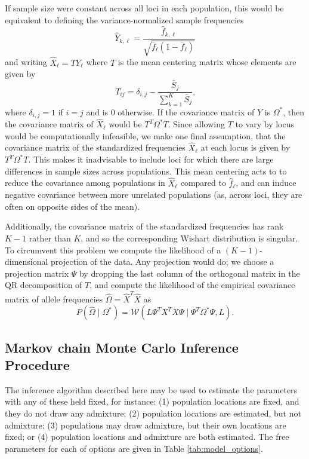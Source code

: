 \documentclass[10pt,letterpaper]{article}
\newcommand{\given}{\mid}
\begin{document}
If sample size were constant across all loci in each population, this would be equivalent to defining the variance-normalized sample frequencies
\begin{equation}
\hat{Y}_{k,\ell} = \frac{ \hat{f}_{k,\ell} } {\sqrt{\bar{f}_{\ell}(1-\bar{f}_{\ell})}}
\end{equation}
and writing $\hat{X}_{\ell} = T Y_{\ell} $ where $T$ is the mean centering matrix whose elements are given by
\begin{equation}
T_{ij} = \delta_{i,j}  -  \frac{\bar{S}_j}{\sum\limits_{k=1}^{K} \bar{S}_j	} \text{,}
\end{equation}
where $\delta_{i,j}=1$ if $i=j$ and is 0 otherwise.
If the covariance matrix of $Y$ is $\Omega^*$,
then the covariance matrix of $\hat X_\ell$ would be $T^T \Omega^* T$.
Since allowing $T$ to vary by locus would be computationally infeasible,
we make one final assumption,
that the covariance matrix of the standardized frequencies $\hat X_\ell$ at each locus is given by $T^T \Omega^* T$.
This makes it inadvisable to include loci for which there are large differences in sample sizes across populations.
This mean centering acts to to reduce the covariance among populations in $\hat{X}_{\ell}$ compared to $\hat{f}_{\ell}$, and can induce negative covariance between more unrelated populations (as, across loci, they are often on opposite sides of the mean). 

Additionally, the covariance matrix of the standardized frequencies has rank $K-1$ rather than $K$,
and so the corresponding Wishart distribution is singular.
To circumvent this problem we compute the likelihood of a $(K-1)$-dimensional projection of the data.
Any projection would do; we choose a projection matrix $\Psi$ by dropping the last column of the orthogonal matrix in the QR decomposition of $T$,
and compute the likelihood of the empirical covariance matrix of allele frequencies $\widehat\Omega = \hat X^T \hat X$ as
\begin{equation} \label{eq:projected_wishart_dist}
  P(\widehat{\Omega} \given \Omega^*) = \mathcal{W}\left( L \Psi^T X^T X \Psi \given  \Psi^{T} \Omega^* \Psi, L \right) \text{.}
\end{equation}

\subsection*{Markov chain Monte Carlo Inference Procedure}

The inference algorithm described here may be used to estimate the parameters with any of these held fixed,
for  instance:
(1) population locations are fixed, and they do not draw any admixture; 
(2) population locations are estimated, but not admixture; 
(3) populations may draw admixture, but their own locations are fixed; or
(4) population locations and admixture are both estimated.  
The free parameters for each of options are given in Table \ref{tab:model_options}.
\end{document}
